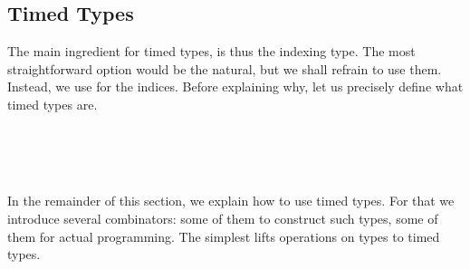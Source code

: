 \subsection{Timed Types}
The main ingredient for timed types, is thus the indexing type.
The most straightforward option would be the natural, but we shall refrain to use them.
Instead, we use  for the indices.
Before explaining why, let us precisely define what timed types are.

\begin{code}%
\>[0]\AgdaSpace{}%
\AgdaSymbol{:}\AgdaSpace{}%
\<%
\\
\>[0]\AgdaSpace{}%
\AgdaSymbol{=}\AgdaSpace{}%
\<%
\\
%
\\[\AgdaEmptyExtraSkip]%
\>[0]\AgdaSpace{}%
\AgdaSymbol{=}\AgdaSpace{}%
\AgdaSpace{}%
\AgdaSpace{}%
\<%
\end{code}

In the remainder of this section, we explain how to use timed types.
For that we introduce several combinators: some of them to construct such types, some of them for actual programming.
The simplest lifts operations on types to timed types.

\begin{code}%
\>[0]\AgdaSpace{}%
\AgdaSymbol{:}\AgdaSpace{}%
\AgdaSpace{}%
\AgdaSpace{}%
\AgdaSpace{}%
\AgdaSpace{}%
\<%
\\
\>[0]\AgdaSymbol{(}\AgdaSpace{}%
\AgdaSpace{}%
\AgdaSymbol{)}\AgdaSpace{}%
\AgdaSpace{}%
\AgdaSymbol{=}\AgdaSpace{}%
\AgdaSpace{}%
\AgdaSpace{}%
\AgdaSpace{}%
\AgdaSpace{}%
\<%
\\
%
\\[\AgdaEmptyExtraSkip]%
\>[0]\AgdaSpace{}%
\AgdaSymbol{:}\AgdaSpace{}%
\AgdaSpace{}%
\AgdaSpace{}%
\AgdaSpace{}%
\AgdaSpace{}%
\<%
\\
\>[0]\AgdaSymbol{(}\AgdaSpace{}%
\AgdaSpace{}%
\AgdaSymbol{)}\AgdaSpace{}%
\AgdaSpace{}%
\AgdaSymbol{=}\AgdaSpace{}%
\AgdaSpace{}%
\AgdaSpace{}%
\AgdaSpace{}%
\AgdaSpace{}%
\<%
\\
%
\\[\AgdaEmptyExtraSkip]%
\>[0]\AgdaSpace{}%
\AgdaSymbol{:}\AgdaSpace{}%
\AgdaSpace{}%
\AgdaSpace{}%
\<%
\\
\>[0]\AgdaSpace{}%
\AgdaSpace{}%
\AgdaSpace{}%
\AgdaSymbol{=}\AgdaSpace{}%
\<%
\end{code}

